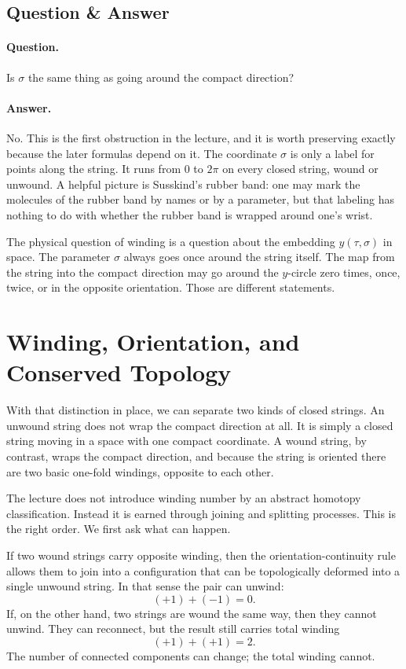 \subsection{Question \& Answer}

\paragraph{Question.} Is \(\sigma\) the same thing as going around the compact direction?

\paragraph{Answer.} No. This is the first obstruction in the lecture, and it is worth preserving exactly because the later formulas depend on it. The coordinate \(\sigma\) is only a label for points along the string. It runs from \(0\) to \(2\pi\) on every closed string, wound or unwound. A helpful picture is Susskind's rubber band: one may mark the molecules of the rubber band by names or by a parameter, but that labeling has nothing to do with whether the rubber band is wrapped around one's wrist.

The physical question of winding is a question about the embedding \(y(\tau,\sigma)\) in space. The parameter \(\sigma\) always goes once around the string itself. The map from the string into the compact direction may go around the \(y\)-circle zero times, once, twice, or in the opposite orientation. Those are different statements.

\section{Winding, Orientation, and Conserved Topology}

With that distinction in place, we can separate two kinds of closed strings. An unwound string does not wrap the compact direction at all. It is simply a closed string moving in a space with one compact coordinate. A wound string, by contrast, wraps the compact direction, and because the string is oriented there are two basic one-fold windings, opposite to each other.

The lecture does not introduce winding number by an abstract homotopy classification. Instead it is earned through joining and splitting processes. This is the right order. We first ask what can happen.

If two wound strings carry opposite winding, then the orientation-continuity rule allows them to join into a configuration that can be topologically deformed into a single unwound string. In that sense the pair can unwind:
\begin{equation}
(+1)+(-1)=0.
\end{equation}
If, on the other hand, two strings are wound the same way, then they cannot unwind. They can reconnect, but the result still carries total winding
\begin{equation}
(+1)+(+1)=2.
\end{equation}
The number of connected components can change; the total winding cannot.

